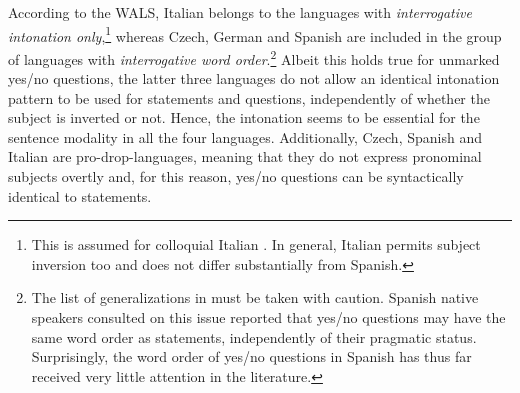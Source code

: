 According to the WALS, Italian belongs to the languages with \textit{interrogative intonation only},\footnote{This is assumed for colloquial Italian \citep{Dryer2013}. In general, Italian permits subject inversion too and does not differ substantially from Spanish.} whereas Czech, German and Spanish are included in the group of languages with \textit{interrogative word order}.\footnote{The list of generalizations in  must be taken with caution. Spanish native speakers consulted on this issue reported that yes/no questions may have the same word order as statements, independently of their pragmatic status. Surprisingly, the word order of yes/no questions in Spanish has thus far received very little attention in the literature.} Albeit this holds true for unmarked yes/no questions, the latter three languages do not allow an identical intonation pattern to be used for statements and questions, independently of whether the subject is inverted or not. Hence, the intonation seems to be essential for the sentence modality in all the four languages. Additionally, Czech, Spanish and Italian are pro-drop-languages, meaning that they do not express pronominal subjects overtly and, for this reason, yes/no questions can be syntactically identical to statements.


